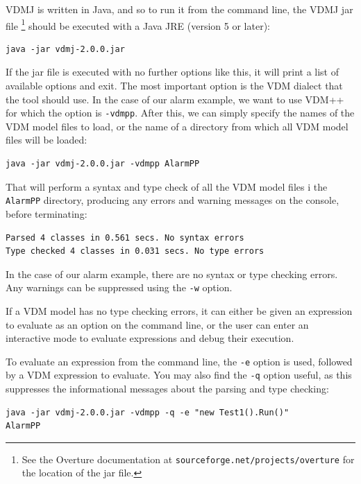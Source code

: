 VDMJ is written in Java, and so to run it from the command line, the
VDMJ jar file \footnote{See the Overture documentation at
  \texttt{sourceforge.net/projects/overture} for the location of the
  jar file.}  should be executed with a Java JRE (version 5 or later):

\lstset{style=tool,language=}
\begin{lstlisting}
java -jar vdmj-2.0.0.jar
\end{lstlisting}

\noindent If the jar file is executed with no further options like this, it will
print a list of available options and exit. The most important option is the VDM
dialect that the tool should use. In the case of our alarm example, we want to
use VDM++ for which the option is \verb|-vdmpp|. After this, we can simply
specify the names of the VDM model files to load, or the name of a
directory from which all VDM model files will be loaded:

\begin{lstlisting}
java -jar vdmj-2.0.0.jar -vdmpp AlarmPP
\end{lstlisting}

\noindent That will perform a syntax and type check of all the
VDM model files i the \verb|AlarmPP| directory, producing any
errors and warning messages on the console, before terminating:

\begin{lstlisting}
Parsed 4 classes in 0.561 secs. No syntax errors
Type checked 4 classes in 0.031 secs. No type errors
\end{lstlisting}

\noindent In the case of our alarm example, there are no syntax or
type checking errors. Any warnings can be suppressed using the
\verb|-w| option.

If a VDM model has no type checking errors, it can either be given
an expression to evaluate as an option on the command line, or the
user can enter an interactive mode to evaluate expressions and debug
their execution.

To evaluate an expression from the command line, the \verb|-e| option
is used, followed by a VDM expression to evaluate. You may also find
the \verb|-q| option useful, as this suppresses the informational
messages about the parsing and type checking:

\begin{lstlisting}
java -jar vdmj-2.0.0.jar -vdmpp -q -e "new Test1().Run()" 
AlarmPP
\end{lstlisting}

